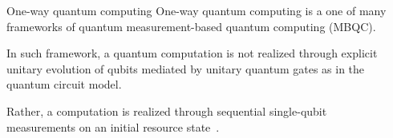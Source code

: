 \documentclass[final]{beamer}
\newlength{\sepwidth}
\newlength{\colwidth}
\newcommand{\separatorcolumn}{\begin{column}{\sepwidth}\end{column}}
\begin{document}
    \begin{frame}[t]
        \begin{columns}[t]
            \separatorcolumn

            \begin{column}{\colwidth}
                \begin{block}{One-way quantum computing}
                    One-way quantum computing is a one of many frameworks of quantum
                    measurement-based quantum computing (MBQC).

                    In such framework, a quantum computation is not realized through explicit
                    unitary evolution of qubits mediated by unitary quantum gates as in the
                    quantum circuit model.

                    Rather, a computation is realized through sequential single-qubit
                    measurements on an initial resource
                    state~\cite{PhysRevA.68.022312}.

                    \begin{figure}[H]
                        \centering
\end{figure}
\end{block}
\end{column}
\end{columns}
\end{frame}
\end{document}
